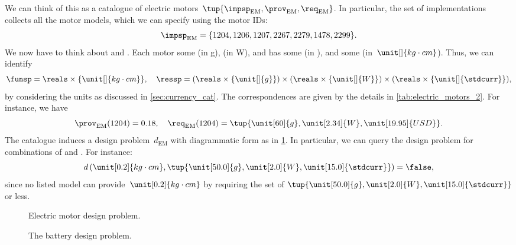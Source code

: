 \begin{example}
  We can think of this as a catalogue of electric motors~$\tup{\impsp_\mathrm{EM},\prov_\mathrm{EM},\req_\mathrm{EM}}$.
  In particular, the set of implementations collects all the motor models, which we can specify using the motor IDs:
  \begin{equation}
    \impsp_\mathrm{EM}=\{1204,1206,1207,2267,2279,1478,2299 \}.
  \end{equation}
  We now have to think about  and .
  Each motor  some  (in \unit[]{g}),  (in \unit[]{W}), and has some  (in \stdcurr), and  some  (in~$\unit[]{kg\cdot cm}$).
  Thus, we can identify
  \begin{equation*}
    \funsp =\reals\times \{\unit[]{kg\cdot cm}\},\quad \ressp=(\reals\times \{\unit[]{g}\})\times (\reals\times \{\unit[]{W}\})\times (\reals\times \{\unit[]{\stdcurr}\}),
  \end{equation*}
  by considering the units as discussed in \cref{sec:currency_cat}.
  The correspondences are given by the details in \cref{tab:electric_motors_2}.
  For instance, we have
  \begin{equation}
    \prov_\mathrm{EM}(1204)=0.18, \quad \req_\mathrm{EM}(1204)=\tup{\unit[60]{g},\unit[2.34]{W},\unit[19.95]{USD}}.
  \end{equation}
  The catalogue induces a design problem~$d_\mathrm{EM}$ with diagrammatic form as in \cref{fig:dp_em}. In particular, we can query the design problem for combinations of  and . For instance:
  \begin{equation}
    d\left(\unit[0.2]{kg\cdot cm}, \tup{\unit[50.0]{g},\unit[2.0]{W},\unit[15.0]{\stdcurr}} \right)=\false,
  \end{equation}
  since no listed model can provide~$\unit[0.2]{kg\cdot cm}$  by requiring the set of  $\tup{\unit[50.0]{g},\unit[2.0]{W},\unit[15.0]{\stdcurr}}$ or less.

  \begin{figure}[tbh]
    \begin{center}
    \end{center}
    \caption{Electric motor design problem.}\label{fig:dp_em}
  \end{figure}

  \begin{figure}[tbh]
    \begin{center}
    \end{center}
    \caption{The battery design problem.}
    \label{fig:dp_battery}
  \end{figure}


\end{example}
